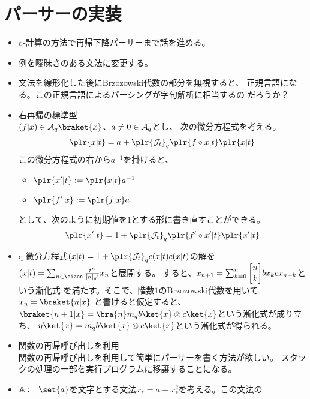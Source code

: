 {%
\section{パーサーの実装}\label{s1:パーサーの実装} %
	\begin{itemize}\setlength{\itemsep}{-1mm} %
		\item q-計算の方法で再帰下降パーサーまで話を進める。
		\item 例を曖昧さのある文法に変更する。
		\item 文法を線形化した後にBrzozowski代数の部分を無視すると、
		正規言語になる。この正規言語によるパーシングが字句解析に相当するの
		だろうか？
		\item 右再帰の標準型 \\
		$(f|x)\in\calA_q\braket{x}$、$a\neq0\in\mathcal{A}_q$とし、
		次の微分方程式を考える。
		\begin{equation*}\begin{split}
			\plr{x|t} = a + \plr{\calJ_t}_q\plr{f\circ x|t}\plr{x|t}
		\end{split}\end{equation*}
		この微分方程式の右から$a^{-1}$を掛けると、
		\begin{itemize}\setlength{\itemsep}{-1mm} %
			\item $\plr{x'|t}:=\plr{x|t}a^{-1}$
			\item $\plr{f'|x}:=\plr{f|x}a$
		\end{itemize} %
		として、次のように初期値を$1$とする形に書き直すことができる。
		\begin{equation*}\begin{split}
			\plr{x'|t} = 1 + \plr{\calJ_t}_q\plr{f'\circ x'|t}\plr{x'|t}
		\end{split}\end{equation*}
		\item q-微分方程式$(x|t)=1+\plr{\calJ_t}_qc(x|t)c(x|t)$の解を
		$(x|t)=\sum_{n\in\sizen}\frac{t^n}{[n]_q!}x_n$と展開する。
		すると、$x_{n+1}=\sum_{k=0}^n\qbinom{n}{k}bx_kcx_{n-k}$という漸化式
		を満たす。そこで、階数$1$のBrzozowski代数を用いて$x_n=\braket{n|x}$
		と書けると仮定すると、$\braket{n+1|x}=\bra{n}m_qb\ket{x}\otimes
		c\ket{x}$という漸化式が成り立ち、
		$\eta\ket{x}=m_qb\ket{x}\otimes c\ket{x}$という漸化式が得られる。
		\item 関数の再帰呼び出しを利用 \\
		関数の再帰呼び出しを利用して簡単にパーサーを書く方法が欲しい。
		スタックの処理の一部を実行プログラムに移譲することになる。
		\item $\bbA:=\set{a}$を文字とする文法$x_*=a+x_*^2$を考える。この文法の

\end{itemize}}
